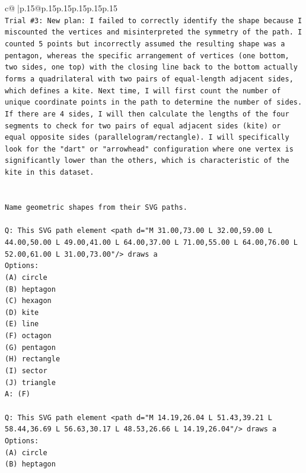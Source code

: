 \documentclass{article}
\begin{document}
{\begin{supertabular}{c@{$\;$}|p{.15\linewidth}@{}p{.15\linewidth}p{.15\linewidth}p{.15\linewidth}p{.15\linewidth}p{.15\linewidth}}
{{{\\ 
\texttt{Trial \#3: New plan: I failed to correctly identify the shape because I miscounted the vertices and misinterpreted the symmetry of the path. I counted 5 points but incorrectly assumed the resulting shape was a pentagon, whereas the specific arrangement of vertices (one bottom, two sides, one top) with the closing line back to the bottom actually forms a quadrilateral with two pairs of equal{-}length adjacent sides, which defines a kite. Next time, I will first count the number of unique coordinate points in the path to determine the number of sides. If there are 4 sides, I will then calculate the lengths of the four segments to check for two pairs of equal adjacent sides (kite) or equal opposite sides (parallelogram/rectangle). I will specifically look for the "dart" or "arrowhead" configuration where one vertex is significantly lower than the others, which is characteristic of the kite in this dataset.} \\
\\ 
\\ 
\texttt{Name geometric shapes from their SVG paths.} \\
\\ 
\texttt{Q: This SVG path element <path d="M 31.00,73.00 L 32.00,59.00 L 44.00,50.00 L 49.00,41.00 L 64.00,37.00 L 71.00,55.00 L 64.00,76.00 L 52.00,61.00 L 31.00,73.00"/> draws a} \\
\texttt{Options:} \\
\texttt{(A) circle} \\
\texttt{(B) heptagon} \\
\texttt{(C) hexagon} \\
\texttt{(D) kite} \\
\texttt{(E) line} \\
\texttt{(F) octagon} \\
\texttt{(G) pentagon} \\
\texttt{(H) rectangle} \\
\texttt{(I) sector} \\
\texttt{(J) triangle} \\
\texttt{A: (F)} \\
\\ 
\texttt{Q: This SVG path element <path d="M 14.19,26.04 L 51.43,39.21 L 58.44,36.69 L 56.63,30.17 L 48.53,26.66 L 14.19,26.04"/> draws a} \\
\texttt{Options:} \\
\texttt{(A) circle} \\
\texttt{(B) heptagon} \\
}}}
\end{supertabular}}
\end{document}
